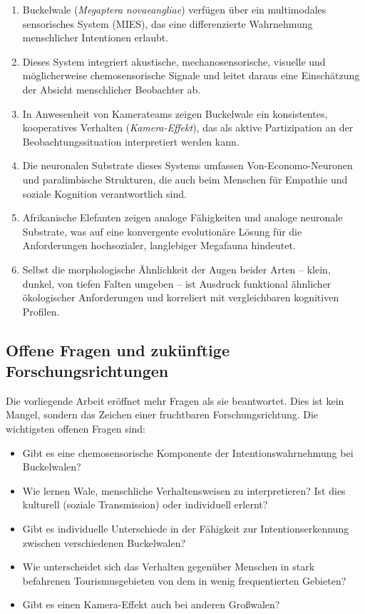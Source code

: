﻿\documentclass[12pt,a4paper]{article}
\theoremstyle{definition}
\theoremstyle{remark}
\begin{document}
\begin{enumerate}
  \item Buckelwale (\textit{Megaptera novaeangliae}) verfügen über ein
        multimodales sensorisches System (MIES), das eine differenzierte
        Wahrnehmung menschlicher Intentionen erlaubt.

  \item Dieses System integriert akustische, mechanosensorische, visuelle
        und möglicherweise chemosensorische Signale und leitet daraus eine
        Einschätzung der Absicht menschlicher Beobachter ab.

  \item In Anwesenheit von Kamerateams zeigen Buckelwale ein konsistentes,
        kooperatives Verhalten (\emph{Kamera-Effekt}), das als aktive
        Partizipation an der Beobachtungssituation interpretiert werden kann.

  \item Die neuronalen Substrate dieses Systems umfassen Von-Economo-Neuronen
        und paralimbische Strukturen, die auch beim Menschen für Empathie und
        soziale Kognition verantwortlich sind.

  \item Afrikanische Elefanten zeigen analoge Fähigkeiten und analoge
        neuronale Substrate, was auf eine konvergente evolutionäre Lösung
        für die Anforderungen hochsozialer, langlebiger Megafauna hindeutet.

  \item Selbst die morphologische Ähnlichkeit der Augen beider Arten --
        klein, dunkel, von tiefen Falten umgeben -- ist Ausdruck
        funktional ähnlicher ökologischer Anforderungen und korreliert
        mit vergleichbaren kognitiven Profilen.
\end{enumerate}

\subsection{Offene Fragen und zukünftige Forschungsrichtungen}

Die vorliegende Arbeit eröffnet mehr Fragen als sie beantwortet. Dies ist
kein Mangel, sondern das Zeichen einer fruchtbaren Forschungsrichtung.
Die wichtigsten offenen Fragen sind:

\begin{itemize}
  \item Gibt es eine chemosensorische Komponente der Intentionswahrnehmung
        bei Buckelwalen?
  \item Wie lernen Wale, menschliche Verhaltensweisen zu interpretieren?
        Ist dies kulturell (soziale Transmission) oder individuell erlernt?
  \item Gibt es individuelle Unterschiede in der Fähigkeit zur Intentionserkennung
        zwischen verschiedenen Buckelwalen?
  \item Wie unterscheidet sich das Verhalten gegenüber Menschen in stark
        befahrenen Tourismusgebieten von dem in wenig frequentierten Gebieten?
  \item Gibt es einen Kamera-Effekt auch bei anderen Großwalen?
\end{itemize}
\end{document}
